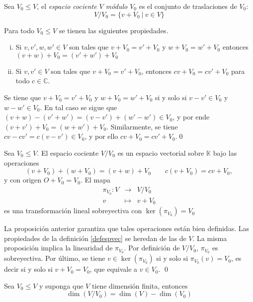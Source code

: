 \begin{defn}
Sea $V_0\le V$, el \emph{espacio cociente $V$ m\'odulo $V_0$} es el conjunto de traslaciones de $V_0$:
\[
V/V_0=\{v+V_0\ |\ v\in V\}
\] 
\end{defn}

\begin{prop}
Para todo $V_0\le V$ se tienen las siguientes propiedades.
\begin{enumerate}[(i)]
  \item Si $v,v',w,w'\in V$ son tales que $v+V_0=v'+V_0$ y $w+V_0=w'+V_0$ entonces $(v+w)+V_0=(v'+w')+V_0$
  \item Si $v,v'\in V$ son tales que $v+V_0=v'+V_0$, entonces $cv+V_0=cv'+V_0$ para todo $c\in\mathbb{C}$.
\end{enumerate}
\end{prop}

\dem Se tiene que $v+V_0=v'+V_0$ y $w+V_0=w'+V_0$ si y solo si $v-v'\in V_0$ y $w-w'\in V_0$. En tal caso se sigue que $(v+w)-(v'+w')=(v-v')+(w'-w')\in V_0$, y por ende $(v+v')+V_0=(w+w')+V_0$. Similarmente, se tiene $cv-cv'=c(v-v')\in V_0$, y por ello $cv+V_0=cv'+V_0$.\qed

\begin{prop}
Sea $V_0\le V$. El espacio cociente $V/V_0$ es un espacio vectorial sobre $\mathbb{K}$ bajo las operaciones
\[
\left(v+V_0\right)+\left(w+V_0\right)=(v+w)+V_0\qquad c\left(v+V_0\right)=cv+V_0,
\]
y con origen $O+V_0=V_0$. El mapa
\begin{eqnarray*}
\pi_{V_0}: V & \longrightarrow & V/V_0 \\
                v & \longmapsto & v+V_0
\end{eqnarray*}
es una transformaci\'on lineal sobreyectiva con $\ker(\pi_{V_0})=V_0$
\end{prop}

\dem La proposici\'on anterior garantiza que tales operaciones est\'an bien definidas. Las propiedades de la definici\'on \ref{defespvec} se heredan de las de $V$. La misma proposici\'on implica la linearidad de $\pi_{V_0}$. Por definici\'on de $V/V_0$, $\pi_{V_0}$ es sobreyectiva. Por \'ultimo, se tiene $v\in\ker(\pi_{V_0})$ si y solo si $\pi_{V_0}(v)=V_0$, es decir si y solo si $v+V_0=V_0$, que equivale a $v\in V_0$. \qed

\begin{prop}
Sea $V_0\le V$ y suponga que $V$ tiene dimensi\'on finita, entonces
\[
\dim(V/V_0)=\dim(V)-\dim(V_0)
\]
\end{prop}

